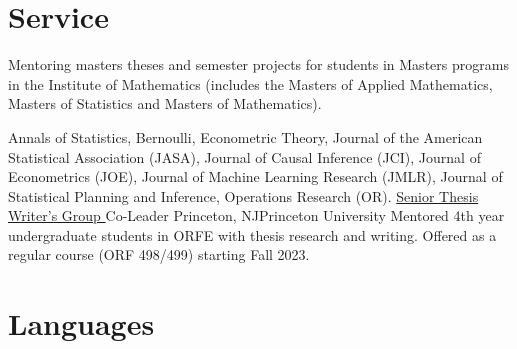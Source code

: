 \documentclass[10pt,a4paper,roman]{moderncv}        %
\begin{document}
\vspace{-0.3cm}
\section{Service}
{}
{Mentoring masters theses and semester projects for students in Masters programs in
  the Institute of Mathematics (includes the Masters of Applied Mathematics,
  Masters of Statistics and Masters of Mathematics).}

{}
{}

{}
{
  Annals of Statistics,
  Bernoulli,
  Econometric Theory,
  Journal of the American Statistical Association (JASA),
  Journal of Causal Inference (JCI),
  Journal of Econometrics (JOE),
  Journal of Machine Learning Research (JMLR),
  Journal of Statistical Planning and Inference,
  Operations Research (OR).
}
{\color{blue}\href{https://orfe.princeton.edu/undergraduate/stwg}{Senior Thesis
    Writer's Group }\color{black} Co-Leader}
{Princeton, NJ}{Princeton University}
{Mentored 4th year undergraduate students in ORFE with thesis research and
  writing. Offered as a regular course (ORF 498/499) starting Fall 2023.
}
\vspace{-0.3cm}
\section{Languages}
\begin{cvcolumns}
\end{cvcolumns}



\clearpage
\end{document}

